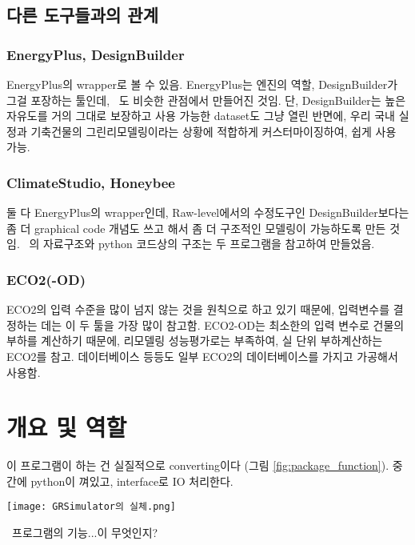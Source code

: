 \subsection{다른 도구들과의 관계}
\subsubsection{EnergyPlus, DesignBuilder}
\simulator\는 EnergyPlus의 wrapper로 볼 수 있음. EnergyPlus는 엔진의 역할, DesignBuilder가 그걸 포장하는 툴인데, \simulator~도 비슷한 관점에서 만들어진 것임. 단, DesignBuilder는 높은 자유도를 거의 그대로 보장하고 사용 가능한 dataset도 그냥 열린 반면에, 우리 \simulator\는 국내 실정과 기축건물의 그린리모델링이라는 상황에 적합하게 커스터마이징하여, 쉽게 사용 가능.

\subsubsection{ClimateStudio, Honeybee}
둘 다 EnergyPlus의 wrapper인데, Raw-level에서의 수정도구인 DesignBuilder보다는 좀 더 graphical code 개념도 쓰고 해서 좀 더 구조적인 모델링이 가능하도록 만든 것임. \simulator~의 자료구조와 python 코드상의 구조는 두 프로그램을 참고하여 만들었음.

\subsubsection{ECO2(-OD)}
\simulator\는 ECO2의 입력 수준을 많이 넘지 않는 것을 원칙으로 하고 있기 때문에, 입력변수를 결정하는 데는 이 두 툴을 가장 많이 참고함. ECO2-OD는 최소한의 입력 변수로 건물의 부하를 계산하기 때문에, 리모델링 성능평가로는 부족하여, 실 단위 부하계산하는 ECO2를 참고. 데이터베이스 등등도 일부 ECO2의 데이터베이스를 가지고 가공해서 사용함.


\section{ 개요 및 역할}

이 프로그램이 하는 건 실질적으로 converting이다 (그림 \ref{fig:package_function}). 중간에 python이 껴있고, interface로 IO 처리한다.

\begin{defaultfigure}
  \texttt{[image: GRSimulator의 실체.png]}
  \caption{\simulator\ 프로그램의 기능...이 무엇인지?}
  \label{fig:package_function}
\end{defaultfigure}
